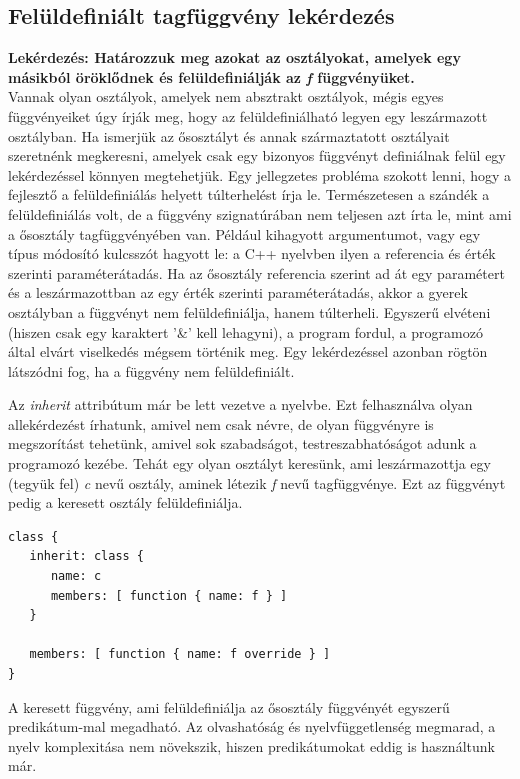 \documentclass[a4paper,12pt]{report}
\begin{document}
\subsection{Felüldefiniált tagfüggvény lekérdezés}
\textbf{Lekérdezés: Határozzuk meg azokat az osztályokat, amelyek egy másikból öröklődnek és felüldefiniálják az \textit{f} függvényüket.}
\\
Vannak olyan osztályok, amelyek nem absztrakt osztályok, mégis egyes függvényeiket úgy írják meg, hogy az felüldefiniálható legyen egy leszármazott osztályban. Ha ismerjük az ősosztályt és annak származtatott osztályait szeretnénk megkeresni, amelyek csak egy bizonyos függvényt definiálnak felül egy lekérdezéssel könnyen megtehetjük. Egy jellegzetes probléma szokott lenni, hogy a fejlesztő a felüldefiniálás helyett túlterhelést írja le. Természetesen a szándék a felüldefiniálás volt, de a függvény szignatúrában nem teljesen azt írta le, mint ami a ősosztály tagfüggvényében van. Például kihagyott argumentumot, vagy egy típus módosító kulcsszót hagyott le: a C++ nyelvben ilyen a referencia és érték szerinti paraméterátadás. Ha az ősosztály referencia szerint ad át egy paramétert és a leszármazottban az egy érték szerinti paraméterátadás, akkor a gyerek osztályban a függvényt nem felüldefiniálja, hanem túlterheli. Egyszerű elvéteni (hiszen csak egy karaktert '\&' kell lehagyni), a program fordul, a programozó által elvárt viselkedés mégsem történik meg. Egy lekérdezéssel azonban rögtön látszódni fog, ha a függvény nem felüldefiniált.
\par Az \textit{inherit} attribútum már be lett vezetve a nyelvbe. Ezt felhasználva olyan allekérdezést írhatunk, amivel nem csak névre, de olyan függvényre is megszorítást tehetünk, amivel sok szabadságot, testreszabhatóságot adunk a programozó kezébe. Tehát egy olyan osztályt keresünk, ami leszármazottja egy (tegyük fel) \textit{c} nevű osztály, aminek létezik \textit{f} nevű tagfüggvénye. Ezt az függvényt pedig a keresett osztály felüldefiniálja.
\begin{verbatim}
class {
   inherit: class { 
      name: c 	
      members: [ function { name: f } ]
   }
   
   members: [ function { name: f override } ]
}
\end{verbatim}
A keresett függvény, ami felüldefiniálja az ősosztály függvényét egyszerű predikátum-mal megadható. Az olvashatóság és nyelvfüggetlenség megmarad, a nyelv komplexitása nem növekszik, hiszen predikátumokat eddig is használtunk már.
\end{document}
